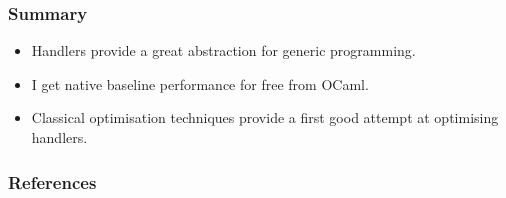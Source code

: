\documentclass[10pt,compress]{beamer}
\begin{document}
\begin{frame}
  \frametitle{Summary}
  \begin{itemize}
    \item Handlers provide a great abstraction for generic programming.
    \item I get native baseline performance for free from OCaml.
    \item Classical optimisation techniques provide a first good attempt at optimising handlers.
  \end{itemize}
\end{frame}

\begin{frame}
  \frametitle{References}
  
  
\end{frame}
\end{document}
